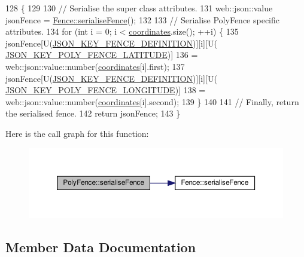 \begin{DoxyCode}
128 \{
129 
130     \textcolor{comment}{// Serialise the super class attributes.}
131     web::json::value jsonFence = \hyperlink{class_fence_a5c8529e80a4444cc9ca0fb660cbf07c8}{Fence::serialiseFence}();
132 
133     \textcolor{comment}{// Serialise PolyFence specific attributes.}
134     \textcolor{keywordflow}{for} (\textcolor{keywordtype}{int} i = 0; i < \hyperlink{class_poly_fence_ae8e0c55e745979cab104ef80aeb4b418}{coordinates}.size(); ++i) \{
135         jsonFence[U(\hyperlink{_fence_8h_a698e69a18d481c1033ae9f7d6fb2e5b6}{JSON\_KEY\_FENCE\_DEFINITION})][i][U(
      \hyperlink{_poly_fence_8h_a9a8bf08118a4bda10ed5efe8cf534024}{JSON\_KEY\_POLY\_FENCE\_LATITUDE})]
136                 = web::json::value::number(\hyperlink{class_poly_fence_ae8e0c55e745979cab104ef80aeb4b418}{coordinates}[i].first);
137         jsonFence[U(\hyperlink{_fence_8h_a698e69a18d481c1033ae9f7d6fb2e5b6}{JSON\_KEY\_FENCE\_DEFINITION})][i][U(
      \hyperlink{_poly_fence_8h_a7411c3395f017461cb1bf07687ee4ef3}{JSON\_KEY\_POLY\_FENCE\_LONGITUDE})]
138                 = web::json::value::number(\hyperlink{class_poly_fence_ae8e0c55e745979cab104ef80aeb4b418}{coordinates}[i].second);
139     \}
140 
141     \textcolor{comment}{// Finally, return the serialised fence.}
142     \textcolor{keywordflow}{return} jsonFence;
143 \}
\end{DoxyCode}
Here is the call graph for this function\+:\nopagebreak
\begin{figure}[H]
\begin{center}
\leavevmode
\includegraphics[width=350pt]{d1/d22/class_poly_fence_ae748da10e4fd15f87b74e0d996f00103_cgraph}
\end{center}
\end{figure}


\subsection{Member Data Documentation}
\mbox{\label{class_poly_fence_a24c99bb8a45f86bdf51cd3f22ef0f174}} 
